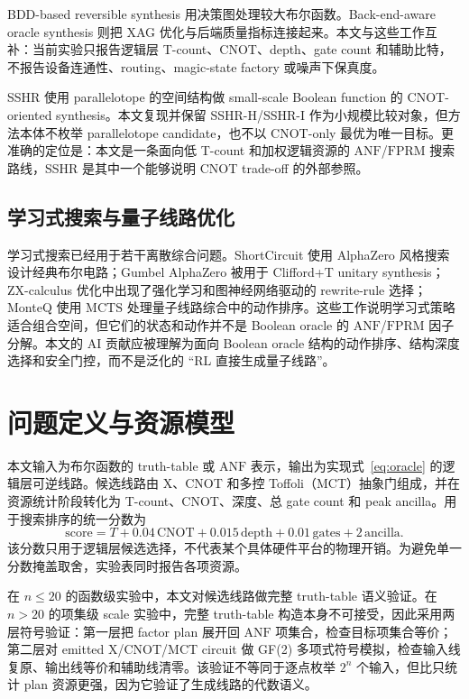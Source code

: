 \documentclass[UTF8,fontset=macnew,11pt]{ctexart}
\newcommand{\score}{\ensuremath{\mathrm{score}}}
\newcommand{\anf}{\ensuremath{\mathrm{ANF}}}
\newcommand{\fprm}{\ensuremath{\mathrm{FPRM}}}
\newcommand{\mcts}{\ensuremath{\mathrm{MCTS}}}
\newcommand{\ttable}{truth-table}
\begin{document}
BDD-based reversible synthesis 用决策图处理较大布尔函数\cite{wille2009bdd}。Back-end-aware oracle synthesis 则把 XAG 优化与后端质量指标连接起来\cite{yu2025backend}。本文与这些工作互补：当前实验只报告逻辑层 T-count、CNOT、depth、gate count 和辅助比特，不报告设备连通性、routing、magic-state factory 或噪声下保真度。

SSHR 使用 parallelotope 的空间结构做 small-scale Boolean function 的 CNOT-oriented synthesis\cite{zheng2025sshr}。本文复现并保留 SSHR-H/SSHR-I 作为小规模比较对象，但方法本体不枚举 parallelotope candidate，也不以 CNOT-only 最优为唯一目标。更准确的定位是：本文是一条面向低 T-count 和加权逻辑资源的 \anf{}/\fprm{} 搜索路线，SSHR 是其中一个能够说明 CNOT trade-off 的外部参照。

\subsection{学习式搜索与量子线路优化}

学习式搜索已经用于若干离散综合问题。ShortCircuit 使用 AlphaZero 风格搜索设计经典布尔电路\cite{tsaras2024shortcircuit}；Gumbel AlphaZero 被用于 Clifford+T unitary synthesis\cite{rietsch2024unitary}；ZX-calculus 优化中出现了强化学习和图神经网络驱动的 rewrite-rule 选择\cite{riu2025rlzx}；MonteQ 使用 \mcts{} 处理量子线路综合中的动作排序\cite{machiya2026monteq}。这些工作说明学习式策略适合组合空间，但它们的状态和动作并不是 Boolean oracle 的 \anf{}/\fprm{} 因子分解。本文的 AI 贡献应被理解为面向 Boolean oracle 结构的动作排序、结构深度选择和安全门控，而不是泛化的 ``RL 直接生成量子线路''。

\section{问题定义与资源模型}

本文输入为布尔函数的 \ttable{} 或 \anf{} 表示，输出为实现式~\eqref{eq:oracle} 的逻辑层可逆线路。候选线路由 X、CNOT 和多控 Toffoli（MCT）抽象门组成，并在资源统计阶段转化为 T-count、CNOT、深度、总 gate count 和 peak ancilla。用于搜索排序的统一分数为
\begin{equation}
  \score = T + 0.04\,\mathrm{CNOT} + 0.015\,\mathrm{depth}
         + 0.01\,\mathrm{gates} + 2\,\mathrm{ancilla}.
  \label{eq:score}
\end{equation}
该分数只用于逻辑层候选选择，不代表某个具体硬件平台的物理开销。为避免单一分数掩盖取舍，实验表同时报告各项资源。

在 $n\leq20$ 的函数级实验中，本文对候选线路做完整 \ttable{} 语义验证。在 $n>20$ 的项集级 scale 实验中，完整 \ttable{} 构造本身不可接受，因此采用两层符号验证：第一层把 factor plan 展开回 \anf{} 项集合，检查目标项集合等价；第二层对 emitted X/CNOT/MCT circuit 做 GF(2) 多项式符号模拟，检查输入线复原、输出线等价和辅助线清零。该验证不等同于逐点枚举 $2^n$ 个输入，但比只统计 plan 资源更强，因为它验证了生成线路的代数语义。
\end{document}
